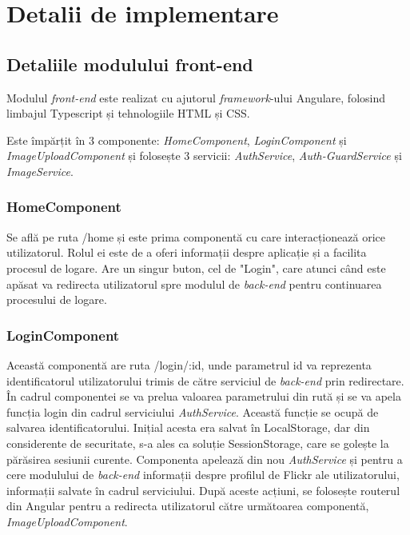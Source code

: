 \chapter{Detalii de implementare}
\section{Detaliile modulului front-end}
Modulul \textit{front-end} este realizat cu ajutorul \textit{framework}-ului Angulare, folosind limbajul Typescript și tehnologiile HTML și CSS.

Este împărțit în 3 componente: \textit{HomeComponent}, \textit{LoginComponent} și \textit{ImageUploadComponent} și folosește 3 servicii: \textit{AuthService}, \textit{Auth-GuardService} și \textit{ImageService}.

\subsection{HomeComponent}
 Se află pe ruta /home și este prima componentă cu care interacționează orice utilizatorul. Rolul ei este de a oferi informații despre aplicație și a facilita procesul de logare. Are un singur buton, cel de "Login", care atunci când este apăsat va redirecta utilizatorul spre modulul de \textit{back-end} pentru continuarea procesului de logare.
 
 \subsection{LoginComponent}
 Această componentă are ruta /login/:id, unde parametrul id va reprezenta identificatorul utilizatorului trimis de către serviciul de \textit{back-end} prin redirectare. În cadrul componentei se va prelua valoarea parametrului din rută și se va apela funcția login din cadrul serviciului \textit{AuthService}. Această funcție se ocupă de salvarea identificatorului. Inițial acesta era salvat în LocalStorage, dar din considerente de securitate, s-a ales ca soluție SessionStorage, care se golește la părăsirea sesiunii curente. Componenta apelează din nou \textit{AuthService} și pentru a cere modulului de \textit{back-end} informații despre profilul de Flickr ale utilizatorului, informații salvate în cadrul serviciului. După aceste acțiuni, se folosește routerul din Angular pentru a redirecta utilizatorul către următoarea componentă, \textit{ImageUploadComponent}.
 
